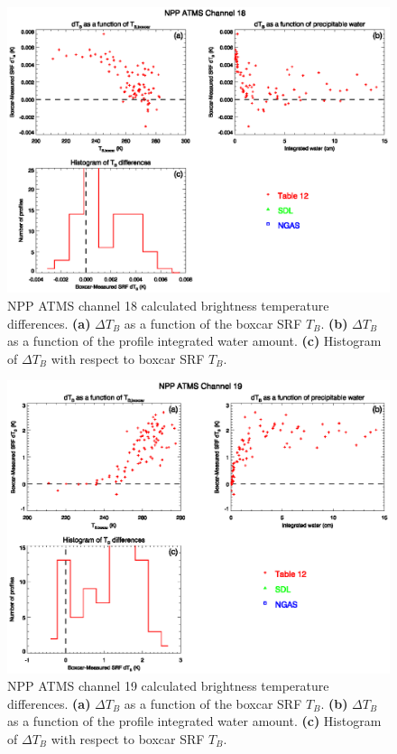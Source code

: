 \begin{figure}[H]
  \centering
  \includegraphics[scale=1]{graphics/dtb/atms_npp.ch18.TbStats.eps}
  \caption{NPP ATMS channel 18 calculated brightness temperature differences. \textbf{(a)} $\Delta T_B$ as a function of the boxcar SRF $T_B$. \textbf{(b)} $\Delta T_B$ as a function of the profile integrated water amount. \textbf{(c)} Histogram of $\Delta T_B$ with respect to boxcar SRF $T_B$.}
  \label{fig:atms_npp.ch18.dtb}
\end{figure}

\begin{figure}[H]
  \centering
  \includegraphics[scale=1]{graphics/dtb/atms_npp.ch19.TbStats.eps}
  \caption{NPP ATMS channel 19 calculated brightness temperature differences. \textbf{(a)} $\Delta T_B$ as a function of the boxcar SRF $T_B$. \textbf{(b)} $\Delta T_B$ as a function of the profile integrated water amount. \textbf{(c)} Histogram of $\Delta T_B$ with respect to boxcar SRF $T_B$.}
  \label{fig:atms_npp.ch19.dtb}
\end{figure}

